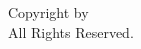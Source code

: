 \begin{center}
    \vspace*{\fill}    
    \raisebox{0.1ex}{\footnotesize\textcopyright} Copyright by~\authorname{} \submissionyear\\
    All Rights Reserved.
\end{center}
\newpage
